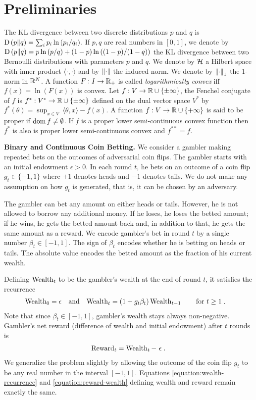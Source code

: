 \section{Preliminaries}
\label{section:preliminaries}

The \ac{KL} divergence between two discrete distributions $p$ and $q$ is
$\operatorname{D}\left({p}\middle\|{q}\right) = \sum_{i} p_i \ln\left( p_i/q_i \right)$. If $p,q$ are real numbers
in $[0,1]$, we denote by $\operatorname{D}\left({p}\middle\|{q}\right) = p \ln \left(p/q \right) + (1-p) \ln
\left((1-p)/(1-q) \right)$ the \ac{KL} divergence between two Bernoulli
distributions with parameters $p$ and $q$.  We denote by $\mathcal{H}$ a Hilbert space
with inner product $\langle \cdot, \cdot\rangle$ and by $\left\|{\cdot}\right\|$ the
induced norm.  We denote by $\left\|{\cdot}\right\|_1$ the $1$-norm in $\mathbb{R}^N$.  A
function $F:I \to \mathbb{R}_+$ is called \emph{logarithmically convex} iff $f(x) =
\ln(F(x))$ is convex.  Let $f:V \to \mathbb{R} \cup \{\pm\infty\}$, the Fenchel
conjugate of $f$ is $f^*:V^* \to \mathbb{R} \cup \{\pm \infty\}$ defined on the dual
vector space $V^*$ by $f^*(\theta) = \sup_{x \in V} \ \langle \theta, x \rangle
- f(x)$.  A function $f:V \to \mathbb{R} \cup \{+ \infty\}$ is said to be proper if
$\operatorname*{dom} f \neq \emptyset$.  If $f$ is a proper lower semi-continuous convex
function then $f^*$ is also is proper lower semi-continuous convex and
$f^{**}=f$.

\textbf{Binary and Continuous Coin Betting.} We consider a gambler making
repeated bets on the outcomes of adversarial coin flips. The gambler starts with an
initial endowment $\epsilon > 0$. In each round $t$, he bets on an outcome of a
coin flip $g_t \in \{-1,1\}$ where $+1$ denotes heads and $-1$ denotes tails.
We do not make any assumption on how $g_t$ is generated, that is, it can be
chosen by an adversary.

The gambler can bet any amount on either heads or tails. However, he is not
allowed to borrow any additional money. If he loses, he loses the betted
amount; if he wins, he gets the betted amount back and, in addition to that, he
gets the same amount as a reward.  We encode gambler's bet in round $t$ by a
single number $\beta_t \in [-1,1]$. The sign of $\beta_t$ encodes whether he is
betting on heads or tails. The absolute value encodes the betted amount as the
fraction of his current wealth.

Defining $\operatorname{Wealth}_t$ to be the gambler's wealth at the end of round $t$, it satisfies the
recurrence
\begin{align}
\label{equation:wealth-recurrence}
\operatorname{Wealth}_0 & = \epsilon &
& \text{and} &
\operatorname{Wealth}_t & = (1 + g_t \beta_t) \operatorname{Wealth}_{t-1} \qquad \text{for $t \ge 1$} \; .
\end{align}
Note that since $\beta_t \in [-1,1]$, gambler's wealth stays always non-negative.
Gambler's net reward (difference of wealth and initial endowment) after $t$
rounds is
\begin{align}
\label{equation:reward-wealth}
\operatorname{Reward}_t = \operatorname{Wealth}_t - \ \epsilon \; .
\end{align}
We generalize the problem slightly by allowing the outcome of the coin flip
$g_t$ to be any real number in the interval $[-1,1]$.  Equations
\eqref{equation:wealth-recurrence} and \eqref{equation:reward-wealth} defining
wealth and reward remain exactly the same.
